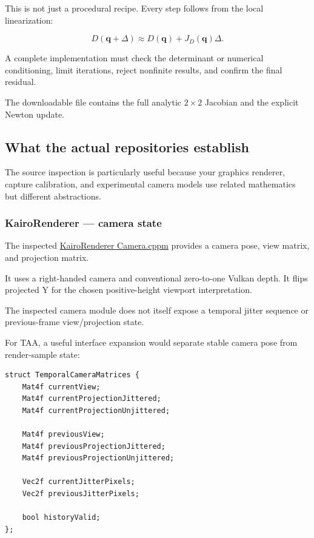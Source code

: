 This is not just a procedural recipe. Every step follows from the local linearization:

\[
 D(\mathbf q+\Delta) \approx D(\mathbf q)+J_D(\mathbf q)\Delta.
\]

A complete implementation must check the determinant or numerical conditioning, limit iterations, reject nonfinite results, and confirm the final residual.

The downloadable file contains the full analytic \(2\times2\) Jacobian and the explicit Newton update.

\subsection{What the actual repositories establish}\label{02-foundations-ii-ch037-what-the-actual-repositories-establish}

\hypertarget{02-foundations-ii-ch037-what-the-actual-repositories-establish}{}

The source inspection is particularly useful because your graphics renderer, capture calibration, and experimental camera models use related mathematics but different abstractions.

\subsubsection{KairoRenderer --- camera state}\label{02-foundations-ii-ch037-kairorenderer-camera-state}

\hypertarget{02-foundations-ii-ch037-kairorenderer-camera-state}{}

The inspected \href{https://github.com/swayam8624/KairoRenderer/blob/main/Camera.cppm?utm_source=chatgpt.com}{KairoRenderer Camera.cppm} provides a camera pose, view matrix, and projection matrix.

It uses a right-handed camera and conventional zero-to-one Vulkan depth. It flips projected Y for the chosen positive-height viewport interpretation.

The inspected camera module does not itself expose a temporal jitter sequence or previous-frame view/projection state.

For TAA, a useful interface expansion would separate stable camera pose from render-sample state:

\begin{verbatim}
struct TemporalCameraMatrices {
    Mat4f currentView;
    Mat4f currentProjectionJittered;
    Mat4f currentProjectionUnjittered;

    Mat4f previousView;
    Mat4f previousProjectionJittered;
    Mat4f previousProjectionUnjittered;

    Vec2f currentJitterPixels;
    Vec2f previousJitterPixels;

    bool historyValid;
};
\end{verbatim}

